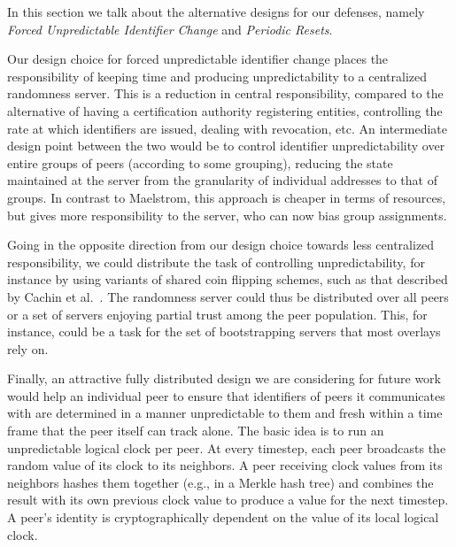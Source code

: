 \documentclass[10pt,twocolumn]{article}
\begin{document}
\label{sec:alternatives}
In this section we talk about the alternative designs for our defenses,
namely \emph{Forced Unpredictable Identifier Change} and
\emph{Periodic Resets}.


Our design choice for forced unpredictable identifier change places the
responsibility of keeping time and producing unpredictability to a centralized
randomness server.  This is a reduction in central responsibility, compared to the
alternative of having a certification authority registering entities,
controlling the rate at which identifiers are issued, dealing with revocation,
etc.  An intermediate design point between the two would be to control
identifier unpredictability over entire groups of peers (according to some
grouping), reducing the state maintained at the server from the granularity of
individual addresses to that of groups.  In contrast to Maelstrom, this
approach is cheaper in terms of resources, but gives more responsibility
to the server, who can now bias group assignments.

Going in the opposite direction from our design choice towards less
centralized responsibility, we could distribute the task of controlling
unpredictability, for instance by using variants of shared coin flipping
schemes, such as that described by Cachin et al.~\cite{Cachin2000}.
The randomness server could thus be distributed over all peers or a set
of servers enjoying partial trust among the peer population.  This, for
instance, could be a task for the set of bootstrapping servers that most
overlays rely on.

Finally, an attractive fully distributed design we are considering
for future work would help an individual peer to ensure that identifiers
of peers it communicates with are determined in a manner unpredictable
to them and fresh within a time frame that the peer itself can track
alone.  The basic idea is to run an unpredictable logical clock per
peer.  At every timestep, each peer broadcasts the random value of its
clock to its neighbors.  A peer receiving clock values from its
neighbors hashes them together (e.g., in a Merkle hash tree) and
combines the result with its own previous clock value to produce a value
for the next timestep.  A peer's identity is cryptographically dependent
on the value of its local logical clock.
\end{document}
